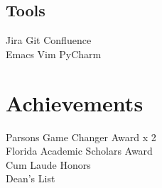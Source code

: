 \documentclass[letterpaper]{deedy-resume}
\begin{document}
\begin{minipage}[t]{0.33\textwidth}
\subsection{Tools}
Jira \textbullet{} Git \textbullet{} Confluence \\
Emacs \textbullet{} Vim \textbullet{} PyCharm

\sectionspace %
\section{Achievements}
Parsons Game Changer Award x 2 \\
Florida Academic Scholars Award \\
Cum Laude Honors \\
Dean's List


\end{minipage} %
\hfill
%
%
\end{document}

